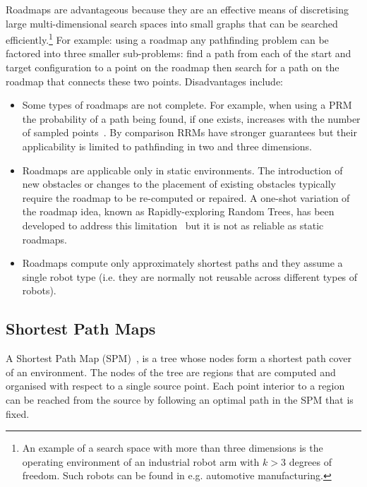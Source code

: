 Roadmaps are advantageous because they are an effective means of discretising
large multi-dimensional search spaces into small graphs that can be searched
efficiently.\footnote{An example of a search space with more than three dimensions
is the operating environment of an industrial robot arm with $k > 3$ degrees of
freedom. Such robots can be found in e.g. automotive manufacturing.}
For example: using a roadmap any pathfinding problem can be
factored into three smaller sub-problems: find a path from each of the start and
target configuration to a point on the roadmap then search for a path on the
roadmap that connects these two points. Disadvantages include:
\begin{itemize}
\item{Some types of roadmaps are not complete. For example, when using a PRM the probability of 
a path being found, if one exists, increases with the number  of sampled points~\citep{barraquand97}. 
By comparison RRMs have stronger guarantees but their applicability
is limited to pathfinding in two and three dimensions.}
\item{Roadmaps are applicable only in static environments. The introduction of
new obstacles or changes to the placement of existing obstacles typically require 
the roadmap to be re-computed or repaired. A one-shot variation of the roadmap idea,
known as Rapidly-exploring Random Trees, has been developed to address this 
limitation~\citep{lavalle98} but it is not as reliable as static roadmaps.}
\item{Roadmaps compute only approximately shortest paths and they assume a single 
robot type (i.e. they are normally not reusable across different types of robots).}
\end{itemize}

\subsection{Shortest Path Maps}
\label{cha::lit::graphs::spm}
A Shortest Path Map (SPM)~\citep{mitchell87,mitchell97}, is a tree whose nodes
form a shortest path cover of an environment.  The nodes of the tree are regions
that are computed and organised with respect to a single source point. Each
point interior to a region can be reached from the source by following an optimal 
path in the SPM that is fixed.

